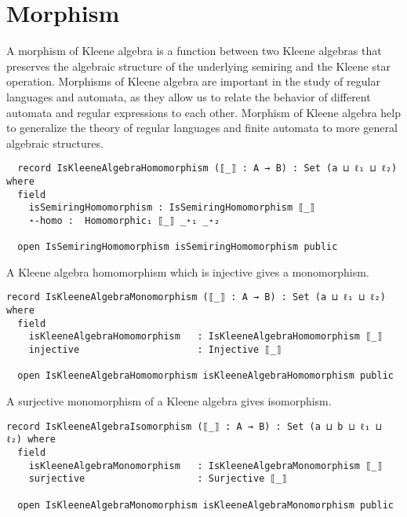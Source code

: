 \section{Morphism}
A morphism of Kleene algebra is a function between two Kleene algebras that
preserves the algebraic structure of the underlying semiring and the Kleene star
operation. Morphisms of Kleene algebra are important in the study of regular
languages and automata, as they allow us to relate the behavior of different
automata and regular expressions to each other. Morphism of Kleene algebra help
to generalize the theory of regular languages and finite automata to more
general algebraic structures.
\begin{verbatim}
  record IsKleeneAlgebraHomomorphism (⟦_⟧ : A → B) : Set (a ⊔ ℓ₁ ⊔ ℓ₂) where
  field
    isSemiringHomomorphism : IsSemiringHomomorphism ⟦_⟧
    ⋆-homo :  Homomorphic₁ ⟦_⟧ _⋆₁ _⋆₂

  open IsSemiringHomomorphism isSemiringHomomorphism public
\end{verbatim}
A Kleene algebra homomorphism which is injective gives a monomorphism. 
\begin{verbatim}
record IsKleeneAlgebraMonomorphism (⟦_⟧ : A → B) : Set (a ⊔ ℓ₁ ⊔ ℓ₂) where
  field
    isKleeneAlgebraHomomorphism   : IsKleeneAlgebraHomomorphism ⟦_⟧
    injective                     : Injective ⟦_⟧

  open IsKleeneAlgebraHomomorphism isKleeneAlgebraHomomorphism public
\end{verbatim}

A surjective monomorphism of a Kleene algebra gives isomorphism.
\begin{verbatim}
record IsKleeneAlgebraIsomorphism (⟦_⟧ : A → B) : Set (a ⊔ b ⊔ ℓ₁ ⊔ ℓ₂) where
  field
    isKleeneAlgebraMonomorphism   : IsKleeneAlgebraMonomorphism ⟦_⟧
    surjective                    : Surjective ⟦_⟧

  open IsKleeneAlgebraMonomorphism isKleeneAlgebraMonomorphism public
\end{verbatim}

